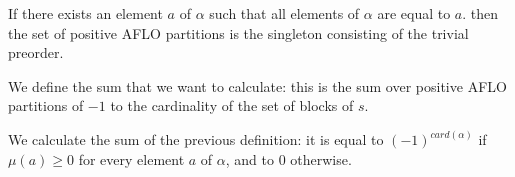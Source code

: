 \begin{sublemma}
If there exists an element $a$ of $\alpha$ such that all elements of $\alpha$ are equal to $a$.
then the set of positive AFLO partitions is the singleton consisting of the trivial preorder.

\end{sublemma}

\begin{subdefi}
We define the sum that we want to calculate: this is the sum over positive AFLO partitions of $-1$ to
the cardinality of the set of blocks of $s$.

\end{subdefi}

\begin{sublemma}
We calculate the sum of the previous definition: it is equal to $(-1)^{card(\alpha)}$ if $\mu(a)\geq 0$ for every element $a$ of $\alpha$,
and to $0$ otherwise.

\end{sublemma}

